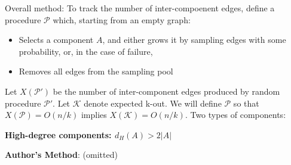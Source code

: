 \documentclass{article}
\begin{document}
	Overall method: To track the number of inter-compoenent edges, define a procedure $\mathcal P$ which, starting from an empty graph:
	\begin{itemize}
		\item Selects a component $A$, and either grows it by sampling edges with some probability, or, in the case of failure,
		\item Removes all edges from the sampling pool
	\end{itemize}
	Let $X(\mathcal P')$ be the number of inter-component edges produced by random procedure $\mathcal P'$. Let $\mathcal K$ denote expected k-out. We will define $\mathcal P$ so that $X(\mathcal P) = O(n / k)$ implies $X(\mathcal K) = O(n / k)$.
	Two types of components:


	\noindent \textbf{\large High-degree components: $d_H(A) > 2\left| A \right|$}
		
	\textbf{Author's Method}: 
	(omitted)
\end{document}
